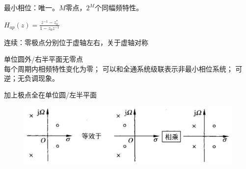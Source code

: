 最小相位：唯一。\(M\)零点，\(2^M\)个同幅频特性。
\begin{description}
\tightlist

\item[全通]\(H_{ap}(z) = \frac{z^{-1}-z_0^*}{1-z_0z^{-1}}\)

连续：零极点分别位于虚轴左右，关于虚轴对称

\item[最小相位] 单位圆外/右半平面无零点 \\
每个周期内相频特性变化为零；
可以和全通系统级联表示非最小相位系统；
可逆；无负调现象。

\item[因果最小相位] 加上极点全在单位圆/左半平面

\vspace{-10pt}
\begin{figure}[H]
    \centering
    \includegraphics[width=\linewidth]{figure/IMG_EB82E9BC56FA-1.jpeg}
\end{figure}
\vspace{-10pt}
\end{description}
\vspace{-10pt}

